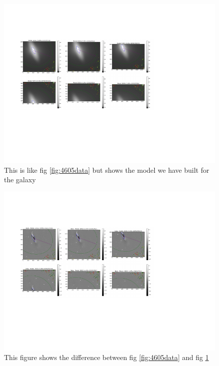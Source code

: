 \documentclass[12pt,preprint,pdftex]{aastex}
\begin{document}
\begin{figure}
\centering
\includegraphics[trim = 1cm 3.2cm 3.8cm 2.15cm,clip=true,width=\textwidth] {model.pdf}
\caption{This is like fig \ref{fig:4605data} but shows the model we have built for the galaxy}
\label{fig:4605model}
\end{figure}

\begin{figure}
\centering
\includegraphics[trim = 1cm 3.2cm 3.8cm 2.15cm,clip=true,width=\textwidth] {diff.pdf}
\caption{This figure shows the difference between fig \ref{fig:4605data} and fig \ref{fig:4605model}}
\label{fig:4605diff}
\end{figure}
\end{document}
